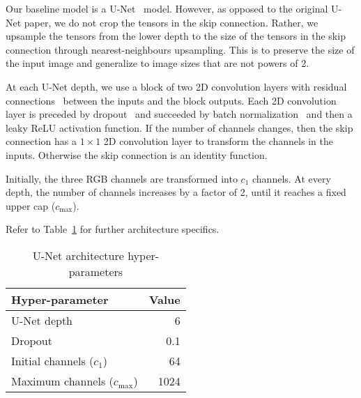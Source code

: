 Our baseline model is a U-Net~\cite{unet} model.
However, as opposed to the original U-Net paper, we do not crop the tensors in the skip connection.
Rather, we upsample the tensors from the lower depth to the size of the tensors in the skip connection through nearest-neighbours upsampling.
This is to preserve the size of the input image and generalize to image sizes that are not powers of 2.

At each U-Net depth, we use a block of two 2D convolution layers with residual connections~\cite{resnet} between the inputs and the block outputs.
Each 2D convolution layer is preceded by dropout~\cite{dropout} and succeeded by batch normalization~\cite{batch-norm} and then a leaky ReLU activation function.
If the number of channels changes, then the skip connection has a $1 \times 1$ 2D convolution layer to transform the channels in the inputs.
Otherwise the skip connection is an identity function.

Initially, the three RGB channels are transformed into $c_1$ channels.
At every depth, the number of channels increases by a factor of 2, until it reaches a fixed upper cap ($c_\mathrm{max}$).%

Refer to Table~\ref{tab:unet-hyper-params} for further architecture specifics.

\begin{table}[h]
    \centering
    \caption{U-Net architecture hyper-parameters}%
    \label{tab:unet-hyper-params}
    \begin{tabular}{l r}
        \toprule
        Hyper-parameter & Value \\
        \midrule
        U-Net depth & 6 \\
        Dropout & 0.1 \\
        Initial channels ($c_1$) & 64 \\
        Maximum channels ($c_\mathrm{max}$) & 1024 \\%
        \bottomrule
    \end{tabular}
\end{table}
